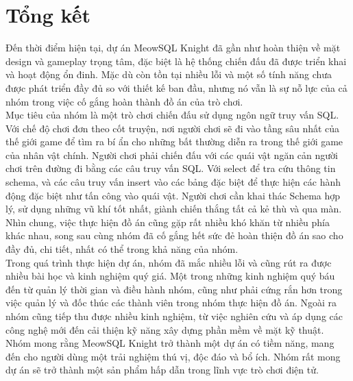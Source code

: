 \section{Tổng kết}
\hspace*{0.5cm} Đến thời điểm hiện tại, dự án MeowSQL Knight đã gần như hoàn thiện về mặt design và gameplay trọng tâm, đặc biệt là hệ thống chiến đấu đã được triển khai và hoạt động ổn đinh. Mặc dù còn tồn tại nhiều lỗi và một số tính năng chưa được phát triển đầy đủ so với thiết kế ban đầu, nhưng nó vẫn là sự nỗ lực của cả nhóm trong việc cố gắng hoàn thành đồ án của trò chơi.\\
\hspace*{0.5cm} Mục tiêu của nhóm là một trò chơi chiến đấu sử dụng ngôn ngữ truy vấn SQL. Với chế độ chơi đơn theo cốt truyện, nơi người chơi sẽ đi vào tầng sâu nhất của thế giới game để tìm ra bí ẩn cho những bất thường diễn ra trong thế giới game của nhân vật chính. Người chơi phải chiến đấu với các quái vật ngăn cản người chơi trên đường đi bằng các câu truy vấn SQL. Với select để tra cứu thông tin schema, và các câu truy vấn insert vào các bảng đặc biệt để thực hiện các hành động đặc biệt như tấn công vào quái vật. Người chơi cần khai thác Schema hợp lý, sử dụng những vũ khí tốt nhất, giành chiến thắng tất cả kẻ thù và qua màn.\\
\hspace*{0.5cm} Nhìn chung, việc thực hiện đồ án cũng gặp rất nhiều khó khăn từ nhiều phía khác nhau, song sau cùng nhóm đã cố gắng hết sức đẻ hoàn thiện đồ án sao cho đầy đủ, chi tiết, nhất có thể trong khả năng của nhóm.\\
\hspace*{0.5cm} Trong quá trình thực hiện dự án, nhóm đã mắc nhiều lỗi và cũng rút ra được nhiều bài học và kinh nghiệm quý giá. Một trong những kinh nghiệm quý báu đến từ quản lý thời gian và điều hành nhóm, cũng như phải cứng rắn hơn trong việc quản lý và đốc thúc các thành viên trong nhóm thực hiện đồ án. Ngoài ra nhóm cũng tiếp thu được nhiều kinh nghiệm, từ việc nghiên cứu và áp dụng các công nghệ mới đến cải thiện kỹ năng xây dựng phần mềm về mặt kỹ thuật.\\
\hspace*{0.5cm}Nhóm mong rằng MeowSQL Knight trở thành một dự án có tiềm năng, mang đến cho người dùng một trải nghiệm thú vị, độc đáo và bổ ích. Nhóm rất mong dự án sẽ trở thành một sản phẩm hấp dẫn trong lĩnh vực trò chơi điện tử.
\newpage